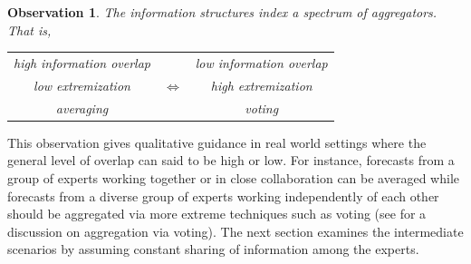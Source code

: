 \documentclass[11pt]{article}
\newtheorem{observation}[theorem]{Observation}
\newtheorem{proposition}[theorem]{Proposition}
\theoremstyle{definition}
\theoremstyle{definition}
\begin{document}
\begin{observation}
The information structures index a spectrum of aggregators. That is,
\begin{center}
\begin{tabular}{ccc}
high information overlap & & low information overlap\\
low extremization & {\Large $\Longleftrightarrow$} & high extremization \\
averaging  & & voting\\
\end{tabular}
\end{center}
\end{observation}

This observation gives qualitative
guidance in real world settings where the general level of overlap 
can said to be high or low.  For instance, forecasts from a group 
of experts working together or in close collaboration can be 
averaged while forecasts from a diverse group of experts working 
independently of each other should be aggregated via more extreme 
techniques such as voting (see \citet{parunak2013characterizing} 
for a discussion on aggregation via voting). The next section examines the intermediate scenarios by assuming constant sharing of information among the experts. 

%
\end{document}
